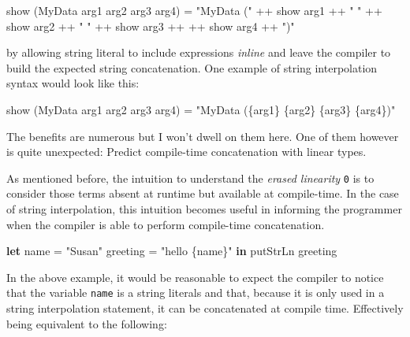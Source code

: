 \documentclass[
]{article}
\newenvironment{Shaded}{}{}
\newcommand{\DataTypeTok}[1]{\textcolor[rgb]{0.56,0.13,0.00}{#1}}
\newcommand{\FunctionTok}[1]{\textcolor[rgb]{0.02,0.16,0.49}{#1}}
\newcommand{\KeywordTok}[1]{\textcolor[rgb]{0.00,0.44,0.13}{\textbf{#1}}}
\newcommand{\NormalTok}[1]{#1}
\newcommand{\OperatorTok}[1]{\textcolor[rgb]{0.40,0.40,0.40}{#1}}
\newcommand{\OtherTok}[1]{\textcolor[rgb]{0.00,0.44,0.13}{#1}}
\newcommand{\StringTok}[1]{\textcolor[rgb]{0.25,0.44,0.63}{#1}}
\begin{document}
\begin{Shaded}
\begin{Highlighting}[]
\FunctionTok{show}\NormalTok{ (}\DataTypeTok{MyData}\NormalTok{ arg1 arg2 arg3 arg4) }\OtherTok{=} \StringTok{"MyData ("} \OperatorTok{++} \FunctionTok{show}\NormalTok{ arg1 }\OperatorTok{++} \StringTok{" "} \OperatorTok{++} \FunctionTok{show}\NormalTok{ arg2 }\OperatorTok{++} \StringTok{" "} \OperatorTok{++} \FunctionTok{show}\NormalTok{ arg3 }\OperatorTok{++} \OperatorTok{++} \FunctionTok{show}\NormalTok{ arg4 }\OperatorTok{++} \StringTok{")"}
\end{Highlighting}
\end{Shaded}

by allowing string literal to include expressions \emph{inline} and
leave the compiler to build the expected string concatenation. One
example of string interpolation syntax would look like this:

\begin{Shaded}
\begin{Highlighting}[]
\FunctionTok{show}\NormalTok{ (}\DataTypeTok{MyData}\NormalTok{ arg1 arg2 arg3 arg4) }\OtherTok{=} \StringTok{"MyData (\{arg1\} \{arg2\} \{arg3\} \{arg4\})"}
\end{Highlighting}
\end{Shaded}

The benefits are numerous but I won't dwell on them here. One of them
however is quite unexpected: Predict compile-time concatenation with
linear types.

As mentioned before, the intuition to understand the \emph{erased
linearity} \texttt{0} is to consider those terms absent at runtime but
available at compile-time. In the case of string interpolation, this
intuition becomes useful in informing the programmer when the compiler
is able to perform compile-time concatenation.

\begin{Shaded}
\begin{Highlighting}[]
\KeywordTok{let}\NormalTok{ name }\OtherTok{=} \StringTok{"Susan"}
\NormalTok{    greeting }\OtherTok{=} \StringTok{"hello \{name\}"} \KeywordTok{in}
    \FunctionTok{putStrLn}\NormalTok{ greeting}
\end{Highlighting}
\end{Shaded}

In the above example, it would be reasonable to expect the compiler to
notice that the variable \texttt{name} is a string literals and that,
because it is only used in a string interpolation statement, it can be
concatenated at compile time. Effectively being equivalent to the
following:
\end{document}
